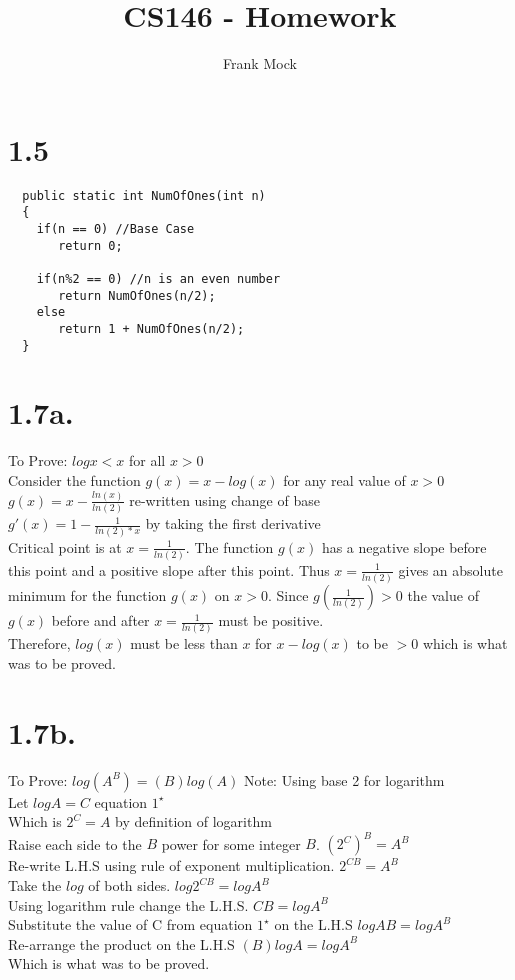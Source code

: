 \documentclass[12pt,letterpaper]{article}
\title{CS146 - Homework}
\author{Frank Mock}
\begin{document}
\maketitle
\section*{1.5}
\begin{verbatim}
  public static int NumOfOnes(int n)
  {
  	if(n == 0) //Base Case
  	   return 0;
  	   
  	if(n%2 == 0) //n is an even number
  	   return NumOfOnes(n/2);
  	else
  	   return 1 + NumOfOnes(n/2);
  }
\end{verbatim}
\section*{1.7a.}
To Prove: $log x < x$ for all $x > 0$\\
Consider the function $g(x) = x - log(x)$ for any real value of $x > 0$\\
$g(x) = x - \frac{ln(x)}{ln(2)}$   re-written using change of base\\
$g'(x) = 1 - \frac{1}{ln(2)*x}$   by taking the first derivative\\
Critical point is at $x = \frac{1}{ln(2)}$. The function $g(x)$ has a negative slope before this point and a positive slope after this point. Thus $x = \frac{1}{ln(2)}$ gives an absolute minimum for the function $g(x)$ on $x > 0$.
Since $g(\frac{1}{ln(2)}) > 0$ the value of $g(x)$ before and after $x = \frac{1}{ln(2)}$ must be positive.\\
Therefore, $log(x)$ must be less than $x$ for $x - log(x)$ to be $> 0$ which is what was to be proved.
\newpage
\section*{1.7b.}
To Prove: $log(A^B) = (B)log(A)$ \hspace*{.3 cm} Note: Using base 2 for logarithm\\
Let $log A = C$ \small{equation $1^\star$}\\
Which is $2^C = A$ by definition of logarithm \\
Raise each side to the $B$ power for some integer $B$.\hspace*{1.5 cm} $(2^C)^B = A^B$\\
Re-write L.H.S using rule of exponent multiplication. \hspace*{1.2 cm} $2^{CB} = A^B$\\
Take the $log$ of both sides. \hspace*{5.2 cm} $log 2^{CB} = log A^B$\\
Using logarithm rule change the L.H.S. \hspace*{3.7 cm} $CB = log A^B$\\
Substitute the value of C from \small{equation $1^\star$} on the L.H.S \hspace*{.3 cm} $log A B = log A^B$\\
Re-arrange the product on the L.H.S \hspace*{3.2 cm} $(B)log A = log A^B$\\
Which is what was to be proved.
\end{document}
